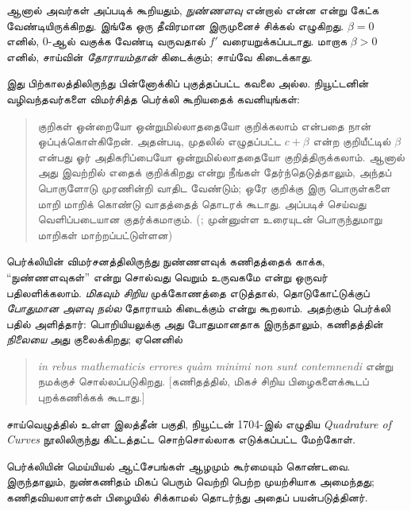 \documentclass[../../../include/open-logic-section]{subfiles}
\begin{document}
ஆனால் அவர்கள் அப்படிக் கூறியதும், \emph{நுண்ணளவு} என்றால் என்ன என்று
கேட்க வேண்டியிருக்கிறது. இங்கே ஒரு தீவிரமான இருமுனைச் சிக்கல்
எழுகிறது. $\beta = 0$ எனில், $0$-ஆல் வகுக்க வேண்டி வருவதால் $f'$
வரையறுக்கப்படாது. மாறாக $\beta >
0$ எனில், சாய்வின் \emph{தோராயம்தான்} கிடைக்கும்; சாய்வே கிடைக்காது.

இது பிற்காலத்திலிருந்து பின்னோக்கிப் புகுத்தப்பட்ட கவலை அல்ல.
நியூட்டனின் வழிவந்தவர்களை விமர்சித்த பெர்க்லி கூறியதைக் கவனியுங்கள்:
\begin{quote}
குறிகள் ஒன்றையோ ஒன்றுமில்லாததையோ குறிக்கலாம் என்பதை நான் ஒப்புக்கொள்கிறேன்.
அதன்படி, முதலில் எழுதப்பட்ட $c + \beta$ என்ற குறியீட்டில் $\beta$
என்பது ஓர் அதிகரிப்பையோ ஒன்றுமில்லாததையோ குறித்திருக்கலாம். ஆனால் அது
இவற்றில் எதைக் குறிக்கிறது என்று நீங்கள் தேர்ந்தெடுத்தாலும், அந்தப்
பொருளோடு முரணின்றி வாதிட வேண்டும்; ஒரே குறிக்கு இரு பொருள்களை மாறி மாறிக்
கொண்டு வாதத்தைத் தொடரக் கூடாது. அப்படிச் செய்வது வெளிப்படையான
குதர்க்கமாகும். (\citealt[\S{}XIII]{Berkeley1734};
முன்னுள்ள உரையுடன் பொருந்துமாறு மாறிகள் மாற்றப்பட்டுள்ளன)
\end{quote}
பெர்க்லியின் விமர்சனத்திலிருந்து நுண்ணளவுக் கணிதத்தைக் காக்க,
“நுண்ணளவுகள்” என்று சொல்வது வெறும் உருவகமே என்று ஒருவர் பதிலளிக்கலாம்.
\emph{மிகவும் சிறிய} முக்கோணத்தை எடுத்தால், தொடுகோட்டுக்குப்
\emph{போதுமான அளவு நல்ல} தோராயம் கிடைக்கும் என்று கூறலாம். அதற்கும்
பெர்க்லி பதில் அளித்தார்: பொறியியலுக்கு அது போதுமானதாக இருந்தாலும்,
கணிதத்தின் \emph{நிலையை} அது குலைக்கிறது; ஏனெனில்
\begin{quote}
\emph{in rebus mathematicis errores qu\`{a}m minimi
non sunt contemnendi} என்று நமக்குச் சொல்லப்படுகிறது. [கணிதத்தில்,
மிகச் சிறிய பிழைகளைக்கூடப் புறக்கணிக்கக் கூடாது.]
\citep[\S{}IX]{Berkeley1734}
\end{quote}
சாய்வெழுத்தில் உள்ள இலத்தீன் பகுதி, நியூட்டன் 1704-இல் எழுதிய
\emph{Quadrature of Curves} நூலிலிருந்து கிட்டத்தட்ட சொற்சொல்லாக
எடுக்கப்பட்ட மேற்கோள்.

பெர்க்லியின் மெய்யியல் ஆட்சேபங்கள் ஆழமும் கூர்மையும் கொண்டவை.
இருந்தாலும், நுண்கணிதம் மிகப் பெரும் வெற்றி பெற்ற முயற்சியாக அமைந்தது;
கணிதவியலாளர்கள் பிழையில் சிக்காமல் தொடர்ந்து அதைப் பயன்படுத்தினர்.
\end{document}

